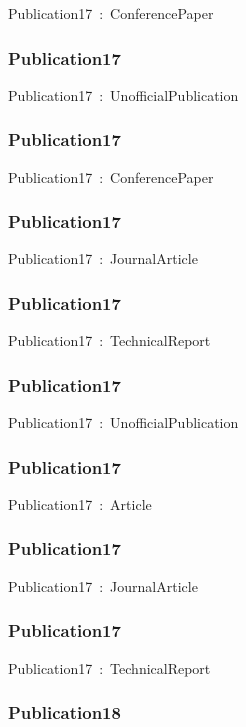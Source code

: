 \documentclass{article}
\begin{document}
Publication17~:~ConferencePaper

\subsubsection*{Publication17}

Publication17~:~UnofficialPublication

\subsubsection*{Publication17}

Publication17~:~ConferencePaper

\subsubsection*{Publication17}

Publication17~:~JournalArticle

\subsubsection*{Publication17}

Publication17~:~TechnicalReport

\subsubsection*{Publication17}

Publication17~:~UnofficialPublication

\subsubsection*{Publication17}

Publication17~:~Article

\subsubsection*{Publication17}

Publication17~:~JournalArticle

\subsubsection*{Publication17}

Publication17~:~TechnicalReport

\subsubsection*{Publication18}
\end{document}
